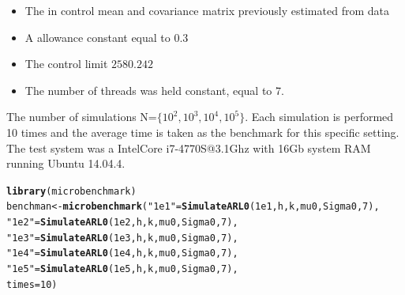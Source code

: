 \documentclass[a4paper,11pt,fleqn,twoside,notitlepage]{report}
\makeatletter
\newcommand{\hlnum}[1]{\textcolor[rgb]{0.686,0.059,0.569}{#1}}%
\newcommand{\hlstr}[1]{\textcolor[rgb]{0.192,0.494,0.8}{#1}}%
\newcommand{\hlstd}[1]{\textcolor[rgb]{0.345,0.345,0.345}{#1}}%
\newcommand{\hlkwb}[1]{\textcolor[rgb]{0.69,0.353,0.396}{#1}}%
\newcommand{\hlkwc}[1]{\textcolor[rgb]{0.333,0.667,0.333}{#1}}%
\newcommand{\hlkwd}[1]{\textcolor[rgb]{0.737,0.353,0.396}{\textbf{#1}}}%
\newenvironment{kframe}{%
 \def\at@end@of@kframe{}%
 \ifinner\ifhmode%
  \def\at@end@of@kframe{\end{minipage}}%
  \begin{minipage}{\columnwidth}%
 \fi\fi%
 \def\FrameCommand##1{\hskip\@totalleftmargin \hskip-\fboxsep
 \colorbox{shadecolor}{##1}\hskip-\fboxsep
     \hskip-\linewidth \hskip-\@totalleftmargin \hskip\columnwidth}%
 \MakeFramed {\advance\hsize-\width
   \@totalleftmargin\z@ \linewidth\hsize
   \@setminipage}}%
 {\par\unskip\endMakeFramed%
 \at@end@of@kframe}
\newenvironment{knitrout}{}{} %
\makeatother
\begin{document}
\begin{itemize}
\item The in control mean and covariance matrix previously estimated from data
\item A allowance constant equal to $0.3$
\item The control limit $2580.242$
\item The number of threads was held constant, equal to 7. 
\end{itemize}
The number of simulations N=$\{10^2,10^3,10^4,10^5\}$. Each simulation is performed 10 times and the average time is taken as the benchmark for this specific setting. 
The test system was a Intel\textregistered Core i7-4770S@3.1Ghz with 16Gb system RAM running Ubuntu 14.04.4.
\begin{knitrout}
\color{fgcolor}\begin{kframe}
\begin{alltt}
\hlkwd{library}\hlstd{(microbenchmark)}
\hlstd{benchman} \hlkwb{<-} \hlkwd{microbenchmark}\hlstd{(}\hlstr{"1e1"}\hlstd{=}\hlkwd{SimulateARL0}\hlstd{(}\hlnum{1e1}\hlstd{, h,k,mu0,Sigma0,}\hlnum{7}\hlstd{),}
                           \hlstr{"1e2"}\hlstd{=}\hlkwd{SimulateARL0}\hlstd{(}\hlnum{1e2}\hlstd{, h,k,mu0,Sigma0,}\hlnum{7}\hlstd{),}
                           \hlstr{"1e3"}\hlstd{=}\hlkwd{SimulateARL0}\hlstd{(}\hlnum{1e3}\hlstd{, h,k,mu0,Sigma0,}\hlnum{7}\hlstd{),}
                           \hlstr{"1e4"}\hlstd{=}\hlkwd{SimulateARL0}\hlstd{(}\hlnum{1e4}\hlstd{, h,k,mu0,Sigma0,}\hlnum{7}\hlstd{),}
                           \hlstr{"1e5"}\hlstd{=}\hlkwd{SimulateARL0}\hlstd{(}\hlnum{1e5}\hlstd{, h,k,mu0,Sigma0,}\hlnum{7}\hlstd{),}
                           \hlkwc{times}\hlstd{=}\hlnum{10}\hlstd{)}
\end{alltt}
\end{kframe}
\end{knitrout}
\end{document}
